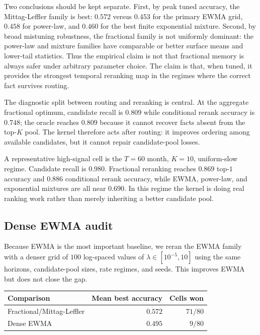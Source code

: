 \documentclass[11pt]{article}
\theoremstyle{plain}
\theoremstyle{definition}
\begin{document}
Two conclusions should be kept separate.  First,
by peak tuned accuracy, the Mittag-Leffler family is
best: $0.572$ versus $0.453$ for the primary EWMA grid,
$0.458$ for power-law, and $0.460$ for the best
finite exponential mixture.  Second, by broad
mistuning robustness, the fractional family is not
uniformly dominant: the power-law and mixture families
have comparable or better surface means and lower-tail
statistics.  Thus the empirical claim is not that
fractional memory is always safer under arbitrary
parameter choice.  The claim is that, when tuned, it
provides the strongest temporal reranking map in the
regimes where the correct fact survives routing.

The diagnostic split between routing and reranking is
central.  At the aggregate fractional optimum, candidate
recall is $0.809$ while conditional rerank accuracy is
$0.748$; the oracle reaches $0.809$ because it cannot
recover facts absent from the top-$K$ pool.  The kernel
therefore acts after routing: it improves ordering among
available candidates, but it cannot repair candidate-pool
losses.

A representative high-signal cell is the $T=60$ month,
$K=10$, uniform-slow regime.  Candidate recall is
$0.980$.  Fractional reranking reaches $0.869$ top-$1$
accuracy and $0.886$ conditional rerank accuracy, while
EWMA, power-law, and exponential mixtures are all near
$0.690$.  In this regime the kernel is doing real ranking
work rather than merely inheriting a better candidate
pool.

\subsection{Dense EWMA audit}

Because EWMA is the most important baseline, we reran the
EWMA family with a denser grid of $100$ log-spaced values
of $\lambda\in[10^{-5},10]$ using the same horizons,
candidate-pool sizes, rate regimes, and seeds.  This
improves EWMA but does not close the gap.

\begin{center}
\begin{tabular}{@{}lrr@{}}
\toprule
Comparison & Mean best accuracy & Cells won \\
\midrule
Fractional/Mittag-Leffler & $\mathbf{0.572}$ & $71/80$ \\
Dense EWMA & $0.495$ & $9/80$ \\
\bottomrule
\end{tabular}
\end{center}
\end{document}
